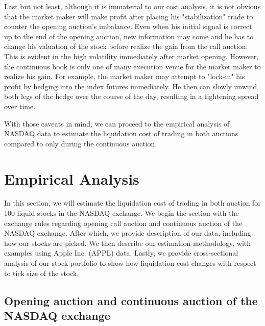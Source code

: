 \documentclass{article}
\begin{document}
Last but not least, although it is immaterial to our cost analysis, it is not obvious that the market maker will make profit after placing his "stabilization" trade to counter the opening auction's imbalance. Even when his initial signal is correct up to the end of the opening auction, new information may come and he has to change his valuation of the stock before realize the gain from the call auction. This is evident in the high volatility immediately after market opening. However, the continuous book is only one of many execution venue for the market maker to realize his gain. For example, the market maker may attempt to "lock-in" his profit by hedging into the index futures immediately. He then can slowly unwind both legs of the hedge over the course of the day, resulting in a tightening spread over time.

With those caveats in mind, we can proceed to the empirical analysis of NASDAQ data to estimate the liquidation cost of trading in both auctions compared to only during the continuous auction.

\section{Empirical Analysis}\label{sec:EmpiricalAnalysis}

In this section, we will estimate the liquidation cost of trading in both auction for 100 liquid stocks in the NASDAQ exchange. We begin the section with the exchange rules regarding opening call auction and continuous auction of the NASDAQ exchange. After which, we provide description of our data, including how our stocks are picked. We then describe our estimation methodology, with examples using Apple Inc. (APPL) data. Lastly, we provide cross-sectional analysis of our stock portfolio to show how liquidation cost changes with respect to tick size of the stock.

\subsection{Opening auction and continuous auction of the NASDAQ exchange}
\end{document}
